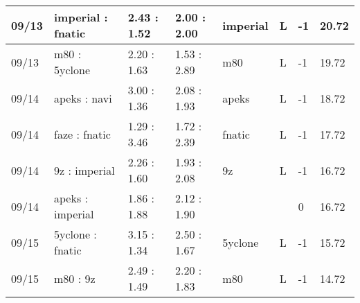 \begin{small}
\begin{longtable}{|l|l|l|l|l|l|l|l|}
	09/13                               & imperial : fnatic                   & 2.43 : 1.52                             & 2.00 : 2.00                             & imperial                          & L                                 & -1                                   & 20.72                             \\ \hline
	09/13                               & m80 : 5yclone                       & 2.20 : 1.63                             & 1.53 : 2.89                             & m80                               & L                                 & -1                                   & 19.72                             \\ \hline
	09/14                               & apeks : navi                        & 3.00 : 1.36                             & 2.08 : 1.93                             & apeks                             & L                                 & -1                                   & 18.72                             \\ \hline
	09/14                               & faze : fnatic                       & 1.29 : 3.46                             & 1.72 : 2.39                             & fnatic                            & L                                 & -1                                   & 17.72                             \\ \hline
	09/14                               & 9z : imperial                       & 2.26 : 1.60                             & 1.93 : 2.08                             & 9z                                & L                                 & -1                                   & 16.72                             \\ \hline
	09/14                               & apeks : imperial                    & 1.86 : 1.88                             & 2.12 : 1.90                             &                                   &                                   & 0                                    & 16.72                             \\ \hline
	09/15                               & 5yclone : fnatic                    & 3.15 : 1.34                             & 2.50 : 1.67                             & 5yclone                           & L                                 & -1                                   & 15.72                             \\ \hline
	09/15                               & m80 : 9z                            & 2.49 : 1.49                             & 2.20 : 1.83                             & m80                               & L                                 & -1                                   & 14.72                             \\ \hline

\end{longtable}
\end{small}
